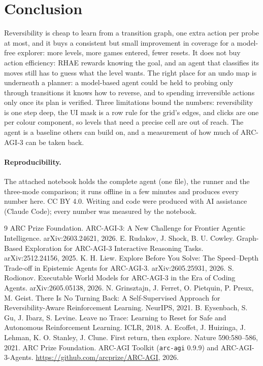 \documentclass[10pt]{article}
\begin{document}
\section{Conclusion}
Reversibility is cheap to learn from a transition graph, one extra action per probe at most, and it buys a consistent but small improvement in coverage for a model-free explorer: more levels, more games entered, fewer resets. It does not buy action efficiency: RHAE rewards knowing the goal, and an agent that classifies its moves still has to guess what the level wants. The right place for an undo map is underneath a planner: a model-based agent could be held to probing only through transitions it knows how to reverse, and to spending irreversible actions only once its plan is verified. Three limitations bound the numbers: reversibility is one step deep, the UI mask is a row rule for the grid's edges, and clicks are one per colour component, so levels that need a precise cell are out of reach. The agent is a baseline others can build on, and a measurement of how much of ARC-AGI-3 can be taken back.

\paragraph{Reproducibility.} The attached notebook holds the complete agent (one file), the runner and the three-mode comparison; it runs offline in a few minutes and produces every number here. CC BY 4.0. Writing and code were produced with AI assistance (Claude Code); every number was measured by the notebook.

\begin{thebibliography}{9}
 ARC Prize Foundation. ARC-AGI-3: A New Challenge for Frontier Agentic Intelligence. arXiv:2603.24621, 2026.
 E. Rudakov, J. Shock, B. U. Cowley. Graph-Based Exploration for ARC-AGI-3 Interactive Reasoning Tasks. arXiv:2512.24156, 2025.
 K. H. Liew. Explore Before You Solve: The Speed--Depth Trade-off in Epistemic Agents for ARC-AGI-3. arXiv:2605.25931, 2026.
 S. Rodionov. Executable World Models for ARC-AGI-3 in the Era of Coding Agents. arXiv:2605.05138, 2026.
 N. Grinsztajn, J. Ferret, O. Pietquin, P. Preux, M. Geist. There Is No Turning Back: A Self-Supervised Approach for Reversibility-Aware Reinforcement Learning. NeurIPS, 2021.
 B. Eysenbach, S. Gu, J. Ibarz, S. Levine. Leave no Trace: Learning to Reset for Safe and Autonomous Reinforcement Learning. ICLR, 2018.
 A. Ecoffet, J. Huizinga, J. Lehman, K. O. Stanley, J. Clune. First return, then explore. Nature 590:580--586, 2021.
 ARC Prize Foundation. ARC-AGI Toolkit (\texttt{arc-agi} 0.9.9) and ARC-AGI-3-Agents. \url{https://github.com/arcprize/ARC-AGI}, 2026.
\end{thebibliography}
\end{document}
